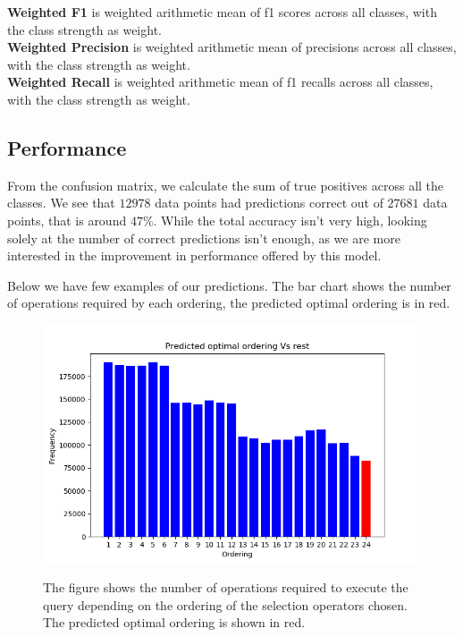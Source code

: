 \par \textbf{Weighted F1} is weighted arithmetic mean of f1 scores across all classes, with the class strength as weight.\\
\textbf{Weighted Precision} is weighted arithmetic mean of precisions across all classes, with the class strength as weight.\\
\textbf{Weighted Recall} is weighted arithmetic mean of f1 recalls across all classes, with the class strength as weight.\\



\subsection{Performance}
From the confusion matrix, we calculate the sum of true positives across all the classes. We see that $12978$ data points had predictions correct out of $27681$ data points, that is around $47\%$. While the total accuracy isn't very high, looking solely at the number of correct predictions isn't enough, as we are more interested in the improvement in performance offered by this model.
\par Below we have few examples of our predictions. The bar chart shows the number of operations required by each ordering, the predicted optimal ordering is in red. 

\begin{figure}
\centering
\includegraphics[scale=0.8]{operations1.png}\\
\caption{The figure shows the number of operations required to execute the query depending on the ordering of the selection operators chosen. The predicted optimal ordering is shown in red.}
\label{fig:operations1}
\end{figure}


